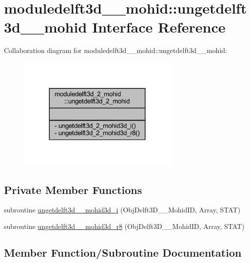 \hypertarget{interfacemoduledelft3d__2__mohid_1_1ungetdelft3d__2__mohid}{}\section{moduledelft3d\+\_\+\_\+mohid\+:\+:ungetdelft3d\+\_\+\_\+mohid Interface Reference}
\label{interfacemoduledelft3d__2__mohid_1_1ungetdelft3d__2__mohid}


Collaboration diagram for moduledelft3d\+\_\+\_\+mohid\+:\+:ungetdelft3d\+\_\+\_\+mohid\+:\nopagebreak
\begin{figure}[H]
\begin{center}
\leavevmode
\includegraphics[width=227pt]{interfacemoduledelft3d__2__mohid_1_1ungetdelft3d__2__mohid__coll__graph}
\end{center}
\end{figure}
\subsection*{Private Member Functions}
\begin{DoxyCompactItemize}
\item 
subroutine \mbox{\hyperlink{interfacemoduledelft3d__2__mohid_1_1ungetdelft3d__2__mohid_a454a38170b34c60a135543701577d403}{ungetdelft3d\+\_\+\_\+mohid3d\+\_\+i}} (Obj\+Delft3\+D\+\_\+\_\+\+Mohid\+ID, Array, S\+T\+AT)
\item 
subroutine \mbox{\hyperlink{interfacemoduledelft3d__2__mohid_1_1ungetdelft3d__2__mohid_a1dfaf73c03f52a89dab9004b29c9aa35}{ungetdelft3d\+\_\+\_\+mohid3d\+\_\+r8}} (Obj\+Delft3\+D\+\_\+\_\+\+Mohid\+ID, Array, S\+T\+AT)
\end{DoxyCompactItemize}


\subsection{Member Function/\+Subroutine Documentation}
\mbox{\label{interfacemoduledelft3d__2__mohid_1_1ungetdelft3d__2__mohid_a454a38170b34c60a135543701577d403}} 
